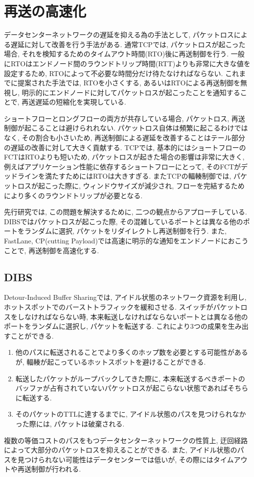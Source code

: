 \section{再送の高速化}
データセンターネットワークの遅延を抑える為の手法として, パケットロスによる遅延に対して改善を行う手法がある. 
通常TCPでは, パケットロスが起こった場合, それを検知するためのタイムアウト時間(RTO)後に再送制御を行う. 
一般にRTOはエンドノード間のラウンドトリップ時間(RTT)よりも非常に大きな値を設定するため, RTOによって不必要な時間分だけ待たなければならない. 
これまでに提案された手法では, RTOを小さくする, あるいはRTOによる再送制御を無視し,
明示的にエンドノードに対してパケットロスが起こったことを通知することで, 再送遅延の短縮化を実現している. 

ショートフローとロングフローの両方が共存している場合, パケットロス, 再送制御が起こることは避けられれない. 
パケットロス自体は頻繁に起こるわけではなく, その割合も小さいため, 再送制御による遅延を改善することはテール部分の遅延の改善に対して大きく貢献する. 
TCPでは, 基本的にはショートフローのFCTはRTOよりも短いため, パケットロスが起きた場合の影響は非常に大きく,  
例えばアプリケーション性能に依存するショートフローにとって, そのFCTがデッドラインを満たすためにはRTOは大きすぎる. 
またTCPの輻輳制御では, パケットロスが起こった際に, ウィンドウサイズが減少され, フローを完結するためにより多くのラウンドトリップが必要となる. 

先行研究では, この問題を解決するために, 二つの観点からアプローチしている. 
DIBS\cite{dibs}ではパケットロスが起こった際, その混雑しているポートとは異なる他のポートをランダムに選択,
パケットをリダイレクトし再送制御を行う. 
また, FastLane\cite{fastlane}, CP(cutting
Payload)\cite{cp}では高速に明示的な通知をエンドノードにおこうことで, 再送制御を高速化する. 

\subsection{DIBS}
Detour-Induced Buffer Sharing\cite{dibs}では, アイドル状態のネットワーク資源を利用し,
ホットスポットでのバーストトラフィックを緩和させる. 
スイッチがパケットロスをしなければならない時, 本来転送しなければならないポートとは異なる他のポートをランダムに選択し, パケットを転送する. 
これにより3つの成果を生み出すことができる. 
\begin{enumerate}
\item 他のパスに転送されることでより多くのホップ数を必要とする可能性があるが, 輻輳が起こっているホットスポットを避けることができる. 
\item 転送したパケットがループバックしてきた際に,
本来転送するべきポートのバッファが占有されていないパケットロスが起こらない状態であればそちらに転送する.
\item そのパケットのTTLに達するまでに, アイドル状態のパスを見つけられなかった際には, パケットは破棄される. 
\end{enumerate}
複数の等価コストのパスをもつデータセンターネットワークの性質上, 迂回経路によって大部分のパケットロスを抑えることができる. 
また, アイドル状態のパスを見つけられない可能性はデータセンターでは低いが, その際にはタイムアウトや再送制御が行われる. 

